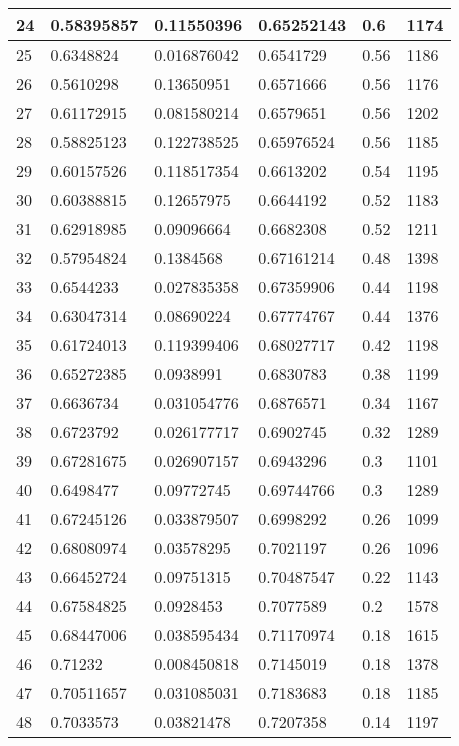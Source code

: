 \begin{longtable}{|l|l|l|l|l|l|}
24 & 0.58395857 & 0.11550396 & 0.65252143 & 0.6 & 1174 \\ \hline 
25 & 0.6348824 & 0.016876042 & 0.6541729 & 0.56 & 1186 \\ \hline 
26 & 0.5610298 & 0.13650951 & 0.6571666 & 0.56 & 1176 \\ \hline 
27 & 0.61172915 & 0.081580214 & 0.6579651 & 0.56 & 1202 \\ \hline 
28 & 0.58825123 & 0.122738525 & 0.65976524 & 0.56 & 1185 \\ \hline 
29 & 0.60157526 & 0.118517354 & 0.6613202 & 0.54 & 1195 \\ \hline 
30 & 0.60388815 & 0.12657975 & 0.6644192 & 0.52 & 1183 \\ \hline 
31 & 0.62918985 & 0.09096664 & 0.6682308 & 0.52 & 1211 \\ \hline 
32 & 0.57954824 & 0.1384568 & 0.67161214 & 0.48 & 1398 \\ \hline 
33 & 0.6544233 & 0.027835358 & 0.67359906 & 0.44 & 1198 \\ \hline 
34 & 0.63047314 & 0.08690224 & 0.67774767 & 0.44 & 1376 \\ \hline 
35 & 0.61724013 & 0.119399406 & 0.68027717 & 0.42 & 1198 \\ \hline 
36 & 0.65272385 & 0.0938991 & 0.6830783 & 0.38 & 1199 \\ \hline 
37 & 0.6636734 & 0.031054776 & 0.6876571 & 0.34 & 1167 \\ \hline 
38 & 0.6723792 & 0.026177717 & 0.6902745 & 0.32 & 1289 \\ \hline 
39 & 0.67281675 & 0.026907157 & 0.6943296 & 0.3 & 1101 \\ \hline 
40 & 0.6498477 & 0.09772745 & 0.69744766 & 0.3 & 1289 \\ \hline 
41 & 0.67245126 & 0.033879507 & 0.6998292 & 0.26 & 1099 \\ \hline 
42 & 0.68080974 & 0.03578295 & 0.7021197 & 0.26 & 1096 \\ \hline 
43 & 0.66452724 & 0.09751315 & 0.70487547 & 0.22 & 1143 \\ \hline 
44 & 0.67584825 & 0.0928453 & 0.7077589 & 0.2 & 1578 \\ \hline 
45 & 0.68447006 & 0.038595434 & 0.71170974 & 0.18 & 1615 \\ \hline 
46 & 0.71232 & 0.008450818 & 0.7145019 & 0.18 & 1378 \\ \hline 
47 & 0.70511657 & 0.031085031 & 0.7183683 & 0.18 & 1185 \\ \hline 
48 & 0.7033573 & 0.03821478 & 0.7207358 & 0.14 & 1197 \\ \hline 

\end{longtable}

